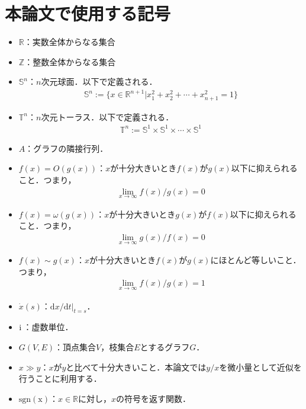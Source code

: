 \documentclass[../main]{subfiles}
\begin{document}
\chapter*{本論文で使用する記号}
\begin{itemize}
    \item
    $\mathbb{R}$：実数全体からなる集合
    \item
    $\mathbb{Z}$：整数全体からなる集合
    \item
    $\mathbb{S}^n$：$n$次元球面．以下で定義される．
    \begin{align*}
        \mathbb{S}^n:=\{x\in\mathbb{R}^{n+1}|x_1^2+x_2^2+\cdots+x_{n+1}^2=1\}
    \end{align*}    
    \item
    $\mathbb{T}^n$：$n$次元トーラス．以下で定義される．
    \begin{align*}
        \mathbb{T}^n:=\mathbb{S}^1\times\mathbb{S}^1\times \cdots\times \mathbb{S}^1
    \end{align*}
    \item 
    $A$：グラフの隣接行列．
    \item
    $f(x)=O(g(x))$：$x$が十分大きいとき$f(x)$が$g(x)$以下に抑えられること．つまり，
    \begin{align*}
        \lim_{x\to\infty}f(x)/g(x)=0
    \end{align*}
    \item
    $f(x)=\omega(g(x))$：$x$が十分大きいとき$g(x)$が$f(x)$以下に抑えられること．つまり，
    \begin{align*}
        \lim_{x\to\infty}g(x)/f(x)=0
    \end{align*}
    \item
    $f(x)\sim g(x)$：$x$が十分大きいとき$f(x)$が$g(x)$にほとんど等しいこと．つまり，
    \begin{align*}
        \lim_{x\to\infty}f(x)/g(x)=1
    \end{align*}    
    \item
    $\dot{x}(s)$：$\mathrm{d}x/\mathrm{d}t|_{t=s}$．
    \item
    ${\mathrm i\,}$：虚数単位．
    \item
    $G(V,E)$：頂点集合$V$，枝集合$E$とするグラフ$G$．
    \item
    $x\gg y$：$x$が$y$と比べて十分大きいこと．本論文では$y/x$を微小量として近似を行うことに利用する．
    \item
    $\operatorname{sgn(x)}$：$x\in\mathbb{R}$に対し，$x$の符号を返す関数．
\end{itemize}
\end{document}
